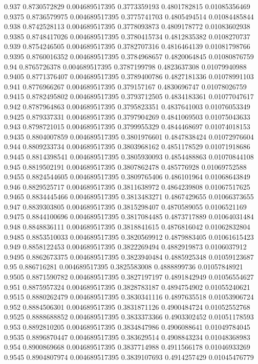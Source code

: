 {0.937 0.8730572829 0.004689517395 0.3773359193 0.4801782815 0.01085356469
0.9375 0.8736579975 0.004689517395 0.3775741703 0.4805494514 0.01084485844
0.938 0.8742528113 0.004689517395 0.3778093873 0.4809178772 0.01083602938
0.9385 0.8748417026 0.004689517395 0.3780415734 0.4812835382 0.0108270737
0.939 0.8754246505 0.004689517395 0.3782707316 0.4816464139 0.01081798766
0.9395 0.8760016352 0.004689517395 0.3784968657 0.4820064845 0.01080876759
0.94 0.8765726378 0.004689517395 0.3787199798 0.4823637308 0.01079940988
0.9405 0.8771376407 0.004689517395 0.3789400786 0.4827181336 0.01078991103
0.941 0.8776966267 0.004689517395 0.379157167 0.4830696747 0.01078026759
0.9415 0.8782495802 0.004689517395 0.3793712505 0.4834183361 0.01077047617
0.942 0.8787964863 0.004689517395 0.3795823351 0.4837641003 0.01076053349
0.9425 0.879337331 0.004689517395 0.3797904269 0.4841069503 0.01075043633
0.943 0.8798721015 0.004689517395 0.3799955329 0.4844468697 0.01074018153
0.9435 0.8804007859 0.004689517395 0.3801976601 0.4847838424 0.01072976604
0.944 0.8809233734 0.004689517395 0.3803968162 0.4851178529 0.01071918686
0.9445 0.8814398541 0.004689517395 0.3805930093 0.4854488863 0.01070844108
0.945 0.8819502191 0.004689517395 0.3807862478 0.485776928 0.01069752588
0.9455 0.8824544605 0.004689517395 0.3809765406 0.486101964 0.01068643849
0.946 0.8829525717 0.004689517395 0.3811638972 0.4864239808 0.01067517625
0.9465 0.8834445466 0.004689517395 0.3813483271 0.4867429655 0.01066373655
0.947 0.8839303805 0.004689517395 0.3815298407 0.4870589055 0.0106521169
0.9475 0.8844100696 0.004689517395 0.3817084485 0.4873717889 0.01064031484
0.948 0.8848836111 0.004689517395 0.3818841615 0.4876816042 0.01062832804
0.9485 0.8853510033 0.004689517395 0.3820569912 0.4879883405 0.01061615423
0.949 0.8858122453 0.004689517395 0.3822269494 0.4882919873 0.0106037912
0.9495 0.8862673375 0.004689517395 0.3823940484 0.4885925348 0.01059123687
0.95 0.886716281 0.004689517395 0.3825583008 0.4888899736 0.01057848921
0.9505 0.8871590782 0.004689517395 0.3827197197 0.4891842949 0.01056554627
0.951 0.8875957324 0.004689517395 0.3828783187 0.4894754902 0.01055240621
0.9515 0.8880262479 0.004689517395 0.3830341116 0.4897635518 0.01053906724
0.952 0.8884506301 0.004689517395 0.3831871126 0.4900484724 0.01052552768
0.9525 0.8888688852 0.004689517395 0.3833373366 0.4903302452 0.01051178593
0.953 0.8892810205 0.004689517395 0.3834847986 0.4906088641 0.01049784045
0.9535 0.8896870447 0.004689517395 0.383629514 0.4908843234 0.01048368983
0.954 0.8900869668 0.004689517395 0.3837714988 0.4911566178 0.01046933269
0.9545 0.8904807974 0.004689517395 0.3839107693 0.4914257429 0.01045476779
}
